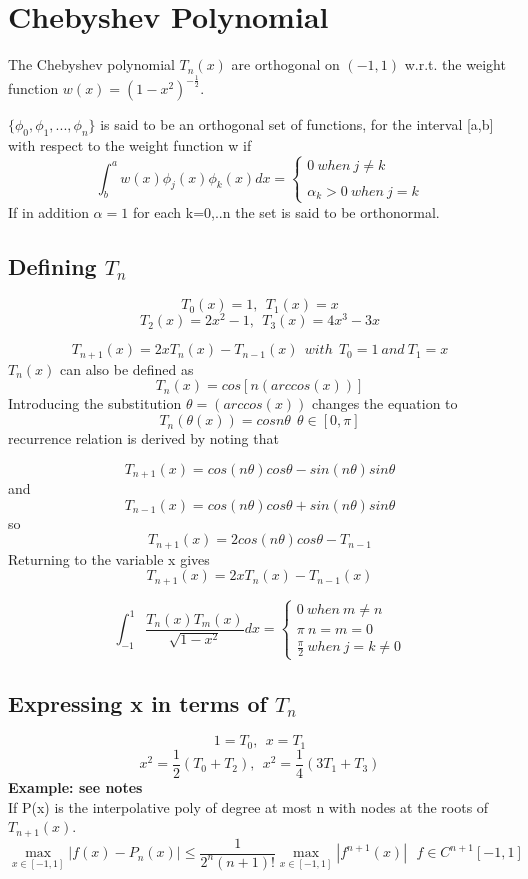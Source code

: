 \section{Chebyshev Polynomial}
\begin{definition}
The Chebyshev polynomial $ {T_{n}(x)}$ are orthogonal on $(-1,1)$ w.r.t. the weight function $w(x) = (1-x^2)^{-\frac{1}{2}}$.
\end{definition}
\begin{definition}
$\{ \phi_0,\phi_1,...,\phi_n  \}$ is said to be an orthogonal set of functions,
for the interval [a,b] with respect to the weight function w if
\[
\int^{a}_{b}w(x)\phi_{j}(x)\phi_{k}(x)dx = \left\{\begin{array}{c}0 \ when \ j\not=k\\
\\
\alpha_k > 0 \ when\ j=k \end{array}\right.
\]
If in addition $\alpha=1$ for each k=0,..n the set is said to be orthonormal.
\end{definition}

\subsection*{Defining $T_{n}$}
\[T_0(x) =1, \ \ T_{1}(x)=x \]
\[T_2(x) =2x^2-1, \ \ T_3(x) =4x^3-3x \]  

\[T_{n+1}(x) = 2xT_{n}(x) - T_{n-1}(x) \ \ with \ \ T_{0}=1 \ and \ T_{1}=x \]
$T_{n}(x)$ can also be defined as 
\[T_{n}(x) = cos[n (arccos (x))]\] 
Introducing the substitution $ \theta = (arccos (x))$ changes the equation to
\[T_{n}(\theta(x)) = cosn \theta  \ \ \theta\in[0,\pi] \] 
recurrence relation is derived by noting that

\[T_{n+1}(x) = cos(n\theta) cos\theta -sin(n\theta)sin\theta \] 
and
\[T_{n-1}(x) = cos(n\theta) cos\theta +sin(n\theta)sin\theta \] 
so
\[T_{n+1}(x) = 2cos(n\theta) cos\theta -T_{n-1} \]
Returning to the variable x gives
\[T_{n+1}(x) = 2x T_{n}(x)  -T_{n-1}(x) \]

\[
\int^{1}_{-1}\frac{T_{n}(x)T_{m}(x)}{\sqrt{1-x^2}}dx = \left\{\begin{array}{c}0 \ when \ m\not=n\\
\pi \ n=m=0 \\
\frac{\pi}{2} \ when\ j=k\not=0 \end{array}\right.
\]
\subsection*{Expressing x in terms of $T_{n}$}
\[1=T_{0}, \ \ x = T_1 \]
\[x^2=\frac{1}{2}(T_{0}+T_{2}), \ \ x^2 =\frac{1}{4}(3T_1+T_3) \]
\textbf{Example: see notes}\\
If P(x) is the interpolative poly of degree at most n with nodes at the roots of $T_{n+1}(x)$.
\[
\max_{x\in [-1,1]} |f(x)-P_n(x)| \leq \frac{1}{2^n(n+1)!}\max_{x\in[-1,1]}|f^{n+1}(x)| \ \ \  f \in C^{n+1}[-1,1] \]

